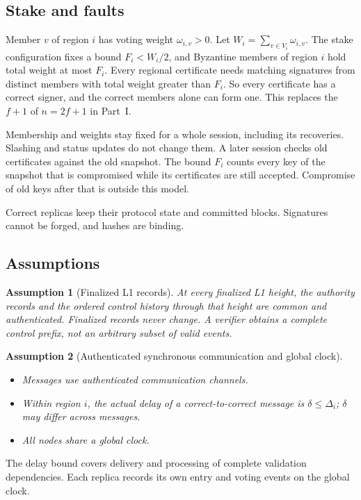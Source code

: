 \documentclass[11pt,a4paper]{article}
\newtheorem{assumption}[assumption]{Assumption}
\newcounter{protocol}
\begin{document}
\subsection{Stake and faults}
\label{sec:stake}
Member $v$ of region $i$ has voting weight $\omega_{i,v}>0$. Let
$W_i=\sum_{v\in V_i}\omega_{i,v}$. The stake configuration fixes a bound
$F_i<W_i/2$, and Byzantine members of region $i$ hold total weight at
most $F_i$. Every regional certificate needs matching signatures from
distinct members with total weight greater than $F_i$. So every
certificate has a correct signer, and the correct members alone can form
one. This replaces the $f+1$ of $n=2f+1$ in Part~I.

Membership and weights stay fixed for a whole session, including its
recoveries. Slashing and status updates do not change them. A later
session checks old certificates against the old snapshot. The bound
$F_i$ counts every key of the snapshot that is compromised while its
certificates are still accepted. Compromise of old keys after that is
outside this model.

Correct replicas keep their protocol state and committed blocks.
Signatures cannot be forged, and hashes are binding.

\subsection{Assumptions}
\label{sec:assumptions}
\begin{assumption}[Finalized L1 records]
\label{ass:authority}
At every finalized L1 height, the authority records and the ordered
control history through that height are common and authenticated.
Finalized records never change. A verifier obtains a complete control
prefix, not an arbitrary subset of valid events.
\end{assumption}

\begin{assumption}[Authenticated synchronous communication and global clock]
\label{ass:network}
\leavevmode\par
\begin{itemize}
\item Messages use authenticated communication channels.
\item Within region $i$, the actual delay of a correct-to-correct
message is $\delta\le\Delta_i$; $\delta$ may differ across messages.
\item All nodes share a global clock.
\end{itemize}
\end{assumption}
The delay bound covers delivery and processing of complete validation
dependencies. Each replica records its own entry and voting events on
the global clock.
\end{document}
